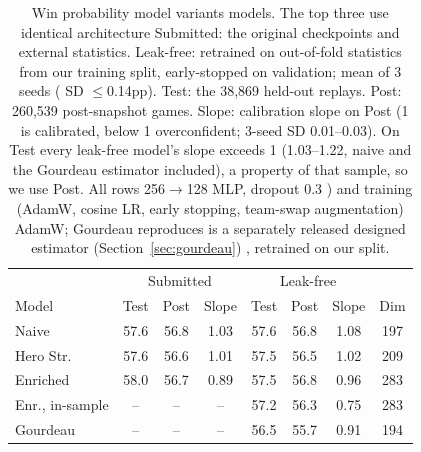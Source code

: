 \documentclass[journal]{IEEEtran}
\providecommand{\DIFaddtex}[1]{{\protect\color{blue} \sf #1}} %
\providecommand{\DIFdeltex}[1]{{\protect\color{red} \scriptsize #1}} %
\providecommand{\DIFaddFL}[1]{\DIFadd{#1}} %
\providecommand{\DIFdelFL}[1]{\DIFdel{#1}} %
\providecommand{\DIFaddbeginFL}{} %
\providecommand{\DIFaddendFL}{} %
\providecommand{\DIFdelbeginFL}{} %
\providecommand{\DIFdelendFL}{} %
\providecommand{\DIFadd}[1]{\texorpdfstring{\DIFaddtex{#1}}{#1}} %
\providecommand{\DIFdel}[1]{\texorpdfstring{\DIFdeltex{#1}}{}} %
\begin{document}
\begin{table}[t]
\centering
\caption{Win probability \DIFdelbeginFL \DIFdelFL{model variants}\DIFdelendFL \DIFaddbeginFL \DIFaddFL{models}\DIFaddendFL . \DIFdelbeginFL \DIFdelFL{The top three use identical architecture }\DIFdelendFL \DIFaddbeginFL \DIFaddFL{Submitted: the original checkpoints and external statistics. Leak-free: retrained on out-of-fold statistics from our training split, early-stopped on validation; mean of 3 seeds }\DIFaddendFL (\DIFaddbeginFL \DIFaddFL{SD $\le$0.14pp). Test: the 38,869 held-out replays. Post: 260,539 post-snapshot games. Slope: calibration slope on Post (1 is calibrated, below 1 overconfident; 3-seed SD 0.01--0.03). On Test every leak-free model's slope exceeds 1 (1.03--1.22, naive and the Gourdeau estimator included), a property of that sample, so we use Post. All rows }\DIFaddendFL 256$\to$128 MLP, dropout 0.3\DIFdelbeginFL \DIFdelFL{) and training (AdamW}\DIFdelendFL , \DIFdelbeginFL \DIFdelFL{cosine LR, early stopping, team-swap augmentation)}\DIFdelendFL \DIFaddbeginFL \DIFaddFL{AdamW}\DIFaddendFL ; Gourdeau \DIFdelbeginFL \DIFdelFL{reproduces }\DIFdelendFL \DIFaddbeginFL \DIFaddFL{is }\DIFaddendFL a separately \DIFdelbeginFL \DIFdelFL{released }\DIFdelendFL \DIFaddbeginFL \DIFaddFL{designed }\DIFaddendFL estimator (Section~\ref{sec:gourdeau})\DIFaddbeginFL \DIFaddFL{, retrained on our split}\DIFaddendFL .}
\label{tab:models}
\DIFdelbeginFL %
\DIFdelendFL \DIFaddbeginFL \setlength{\tabcolsep}{3.4pt}
\begin{tabular}{lccc|ccc|c}
\toprule
& \multicolumn{3}{c|}{Submitted} & \multicolumn{3}{c|}{Leak-free} & \\
Model & Test & Post & Slope & Test & Post & Slope & Dim \\
\midrule
Naive & 57.6 & 56.8 & 1.03 & 57.6 & 56.8 & 1.08 & 197 \\
Hero Str. & 57.6 & 56.6 & 1.01 & 57.5 & 56.5 & 1.02 & 209 \\
Enriched & 58.0 & 56.7 & 0.89 & 57.5 & 56.8 & 0.96 & 283 \\
Enr., in-sample & -- & -- & -- & 57.2 & 56.3 & 0.75 & 283 \\
Gourdeau & -- & -- & -- & 56.5 & 55.7 & 0.91 & 194 \\
\bottomrule
\end{tabular}
\DIFaddendFL \end{table}
\end{document}
